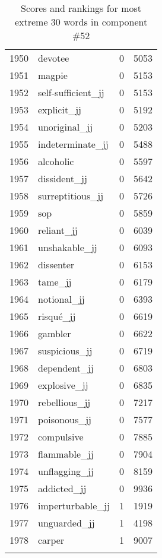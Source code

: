 \begin{longtable}[!htbp]{| rlr@{.}l |}
    1950 & devotee & 0 & 5053 \\
    1951 & magpie & 0 & 5153 \\
    1952 & self-sufficient\_jj & 0 & 5153 \\
    1953 & explicit\_jj & 0 & 5192 \\
    1954 & unoriginal\_jj & 0 & 5203 \\
    1955 & indeterminate\_jj & 0 & 5488 \\
    1956 & alcoholic & 0 & 5597 \\
    1957 & dissident\_jj & 0 & 5642 \\
    1958 & surreptitious\_jj & 0 & 5726 \\
    1959 & sop & 0 & 5859 \\
    1960 & reliant\_jj & 0 & 6039 \\
    1961 & unshakable\_jj & 0 & 6093 \\
    1962 & dissenter & 0 & 6153 \\
    1963 & tame\_jj & 0 & 6179 \\
    1964 & notional\_jj & 0 & 6393 \\
    1965 & risqué\_jj & 0 & 6619 \\
    1966 & gambler & 0 & 6622 \\
    1967 & suspicious\_jj & 0 & 6719 \\
    1968 & dependent\_jj & 0 & 6803 \\
    1969 & explosive\_jj & 0 & 6835 \\
    1970 & rebellious\_jj & 0 & 7217 \\
    1971 & poisonous\_jj & 0 & 7577 \\
    1972 & compulsive & 0 & 7885 \\
    1973 & flammable\_jj & 0 & 7904 \\
    1974 & unflagging\_jj & 0 & 8159 \\
    1975 & addicted\_jj & 0 & 9936 \\
    1976 & imperturbable\_jj & 1 & 1919 \\
    1977 & unguarded\_jj & 1 & 4198 \\
    1978 & carper & 1 & 9007 \\
    \hline
    \caption{Scores and rankings for most extreme 30 words in component \#52} \\
\end{longtable}
